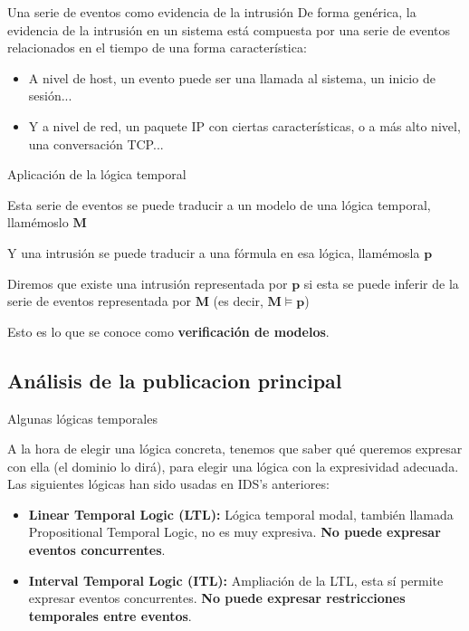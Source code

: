 \documentclass{beamer}
\begin{document}
\begin{frame}{Una serie de eventos como evidencia de la intrusión}
De forma genérica, la evidencia de la intrusión en un sistema está compuesta por una serie de eventos relacionados en el tiempo de una forma característica:

\begin{itemize}
	\item A nivel de host, un evento puede ser una llamada al sistema, un inicio de sesión...
\end{itemize}
\begin{itemize}
	\item Y a nivel de red, un paquete IP con ciertas características, o a más alto nivel, una conversación TCP...
\end{itemize}

\end{frame}

\begin{frame}{Aplicación de la lógica temporal}

Esta serie de eventos se puede traducir a un modelo de una lógica temporal, llamémoslo \(\mathbf{M}\)

Y una intrusión se puede traducir a una fórmula en esa lógica, llamémosla \(\mathbf{p}\)

Diremos que existe una intrusión representada por \(\mathbf{p}\) si esta se puede inferir de la serie de eventos representada por \(\mathbf{M}\) (es decir, \(\mathbf{M \bm{\models} p}\))

Esto es lo que se conoce como \textbf{verificación de modelos}.

\end{frame}

\subsection{Análisis de la publicacion principal}

\begin{frame}{Algunas lógicas temporales}

A la hora de elegir una lógica concreta, tenemos que saber qué queremos expresar con ella (el dominio lo dirá), para elegir una lógica con la expresividad adecuada. Las siguientes lógicas han sido usadas en IDS's anteriores:

\begin{itemize}
	\item \textbf{Linear Temporal Logic (LTL):} Lógica temporal modal, también llamada Propositional Temporal Logic, no es muy expresiva. \textbf{No puede expresar eventos concurrentes}.
\end{itemize}
\begin{itemize}
	\item  \textbf{Interval Temporal Logic (ITL):} Ampliación de la LTL, esta sí permite expresar eventos concurrentes. \textbf{No puede expresar restricciones temporales entre eventos}.
\end{itemize}

\end{frame}
\end{document}
